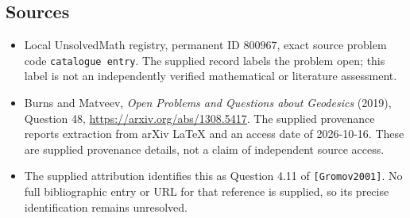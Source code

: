 \documentclass[11pt]{article}
\begin{document}
\subsection{Sources}
\begin{itemize}
\item Local UnsolvedMath registry, permanent ID \(800967\), exact source problem code \texttt{catalogue entry}. The supplied record labels the problem open; this label is not an independently verified mathematical or literature assessment.
\item Burns and Matveev, \emph{Open Problems and Questions about Geodesics} (2019), Question 48, \url{https://arxiv.org/abs/1308.5417}. The supplied provenance reports extraction from arXiv LaTeX and an access date of 2026-10-16. These are supplied provenance details, not a claim of independent source access.
\item The supplied attribution identifies this as Question 4.11 of \texttt{[Gromov2001]}. No full bibliographic entry or URL for that reference is supplied, so its precise identification remains unresolved.
\end{itemize}
\end{document}
